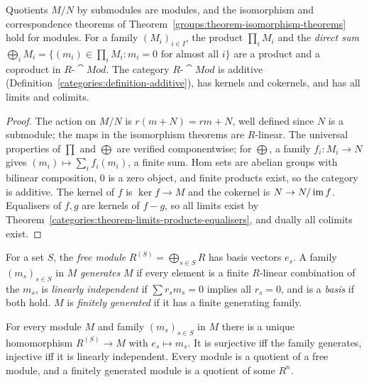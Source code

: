 \begin{proposition}\label{rings:proposition-module-basics}
Quotients $M/N$ by submodules are modules, and the isomorphism and correspondence
theorems of Theorem~\ref{groups:theorem-isomorphism-theorems} hold for modules. For a
family $(M_i)_{i \in I}$, the product $\prod_i M_i$ and the \emph{direct sum}
$\bigoplus_i M_i = \{(m_i) \in \prod_i M_i : m_i = 0 \text{ for almost all } i\}$ are a product and a
coproduct in $R\text{-}\cat{Mod}$. The category $R\text{-}\cat{Mod}$ is additive
(Definition~\ref{categories:definition-additive}), has kernels and cokernels, and has
all limits and colimits.
\end{proposition}

\begin{proof}
The action on $M/N$ is $r(m + N) = rm + N$, well defined since $N$ is a submodule; the
maps in the isomorphism theorems are $R$-linear. The universal properties of $\prod$ and
$\bigoplus$ are verified componentwise; for $\bigoplus$, a family $f_i \colon M_i \to N$ gives
$(m_i) \mapsto \sum_i f_i(m_i)$, a finite sum. Hom sets are abelian groups with bilinear
composition, $0$ is a zero object, and finite products exist, so the category is
additive. The kernel of $f$ is $\ker f \to M$ and the cokernel is $N \to N/\operatorname{im} f$.
Equalisers of $f, g$ are kernels of $f - g$, so all limits exist by
Theorem~\ref{categories:theorem-limits-products-equalisers}, and dually all colimits
exist.
\end{proof}

\begin{definition}\label{rings:definition-free-module}
For a set $S$, the \emph{free module} $R^{(S)} = \bigoplus_{s \in S} R$ has basis vectors
$e_s$. A family $(m_s)_{s \in S}$ in $M$ \emph{generates} $M$ if every element is a finite
$R$-linear combination of the $m_s$, is \emph{linearly independent} if
$\sum r_s m_s = 0$ implies all $r_s = 0$, and is a \emph{basis} if both hold. $M$ is
\emph{finitely generated} if it has a finite generating family.
\end{definition}

\begin{proposition}\label{rings:proposition-free-module}
For every module $M$ and family $(m_s)_{s \in S}$ in $M$ there is a unique homomorphism
$R^{(S)} \to M$ with $e_s \mapsto m_s$. It is surjective iff the family generates, injective
iff it is linearly independent. Every module is a quotient of a free module, and a
finitely generated module is a quotient of some $R^n$.
\end{proposition}

